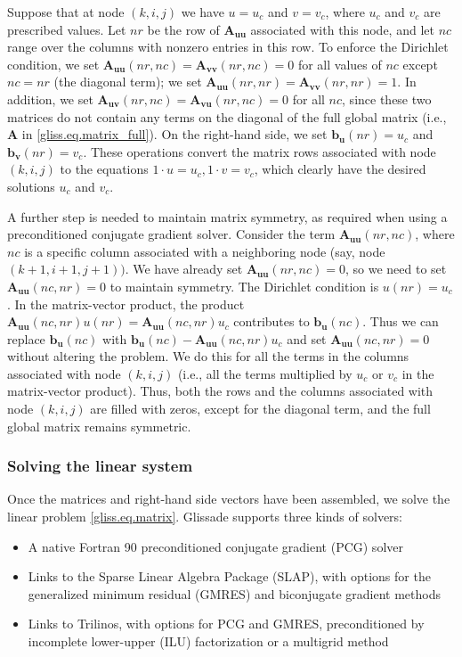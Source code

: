{Suppose that at node $(k,i,j)$ we have $u = u_c$ and $v = v_c$, where $u_c$ and $v_c$ are prescribed values.  
Let $nr$ be the row of $\mathbf{A_{uu}}$ associated with this node, and let $nc$ range over the
columns with nonzero entries in this row.
To enforce the Dirichlet condition, we set $\mathbf{A_{uu}}(nr,nc) = \mathbf{A_{vv}}(nr,nc) = 0$ for all
values of $nc$ except $nc = nr$ (the diagonal term); we set $\mathbf{A_{uu}}(nr,nr) = \mathbf{A_{vv}}(nr,nr) = 1$.
In addition, we set $\mathbf{A_{uv}}(nr,nc) = \mathbf{A_{vu}}(nr,nc) = 0$ for all $nc$, since these two matrices do not contain
any terms on the diagonal of the full global matrix (i.e., $\mathbf{A}$ in \eqref{gliss.eq.matrix_full}).
On the right-hand side, we set $\mathbf{b_u}(nr) = u_c$ and $\mathbf{b_v}(nr) = v_c$.  These operations
convert the matrix rows associated with node $(k,i,j)$ to the equations $1 \cdot u = u_c, 1 \cdot v = v_c$,
which clearly have the desired solutions $u_c$ and $v_c$.

A further step is needed to maintain matrix symmetry, as required
when using a preconditioned conjugate gradient solver.  Consider the term $\mathbf{A_{uu}}(nr,nc)$,
where $nc$ is a specific column associated with a neighboring node (say, node $(k+1,i+1,j+1))$.
We have already set $\mathbf{A_{uu}}(nr,nc) = 0$, so we need to set $\mathbf{A_{uu}}(nc,nr) = 0$ to maintain
symmetry. The Dirichlet condition is $u(nr) = u_c$. 
In the matrix-vector product, the product $\mathbf{A_{uu}}(nc,nr) u(nr) = \mathbf{A_{uu}}(nc,nr) u_c$
contributes to $\mathbf{b_u}(nc)$.  Thus we can replace $\mathbf{b_u}(nc)$ with 
$\mathbf{b_u}(nc) -  \mathbf{A_{uu}}(nc,nr) u_c$
and set $\mathbf{A_{uu}}(nc,nr) = 0$ without altering the problem.
We do this for all the terms in the columns associated with node $(k,i,j)$ (i.e., all the
terms multiplied by $u_c$ or $v_c$ in the matrix-vector product).
Thus, both the rows and the columns associated with node $(k,i,j)$ are filled with zeros,
except for the diagonal term, and the full global matrix remains symmetric.

\subsubsection{Solving the linear system}

Once the matrices and right-hand side vectors have been assembled, we solve the linear problem
\eqref{gliss.eq.matrix}.  Glissade supports three kinds of solvers:

\begin{itemize}
\item A native Fortran 90 preconditioned conjugate gradient (PCG) solver
\item Links to the Sparse Linear Algebra Package (SLAP), with options for 
the generalized minimum residual (GMRES) and biconjugate gradient methods
\item Links to Trilinos, with options for PCG and GMRES, preconditioned by
incomplete lower-upper (ILU) factorization or a multigrid method
\end{itemize}

}
